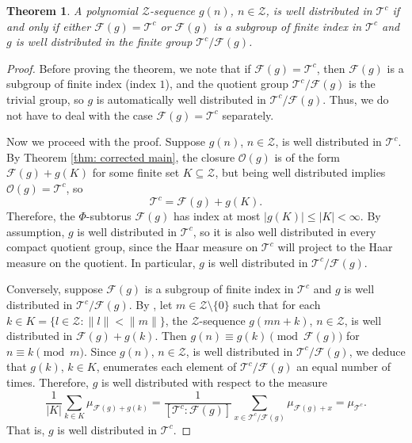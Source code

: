 \documentclass[11pt]{amsart}
\theoremstyle{theorem}
\newtheorem{theorem}{Theorem}[section]
\theoremstyle{definition}
\newcommand{\mZ}{\mathcal{Z}}
\newcommand{\mT}{\mathcal{T}}
\newcommand{\mF}{\mathcal{F}}
\newcommand{\mO}{\mathcal{O}}
\begin{document}
\begin{theorem} \label{thm: correct iff well distributed}
    A polynomial $\mZ$-sequence $g(n)$, $n \in \mZ$, is well distributed in $\mT^c$ if and only if either $\mF(g) = \mT^c$ or $\mF(g)$ is a subgroup of finite index in $\mT^c$ and $g$ is well distributed in the finite group $\mT^c/\mF(g)$.
\end{theorem}

\begin{proof}
    Before proving the theorem, we note that if $\mF(g) = \mT^c$, then $\mF(g)$ is a subgroup of finite index (index $1$), and the quotient group $\mT^c/\mF(g)$ is the trivial group, so $g$ is automatically well distributed in $\mT^c/\mF(g)$.
    Thus, we do not have to deal with the case $\mF(g) = \mT^c$ separately.
    
    Now we proceed with the proof.
    Suppose $g(n)$, $n \in \mZ$, is well distributed in $\mT^c$.
    By Theorem \ref{thm: corrected main}, the closure $\mO(g)$ is of the form $\mF(g) + g(K)$ for some finite set $K \subseteq \mZ$, but being well distributed implies $\mO(g) = \mT^c$, so
    \begin{equation*}
        \mT^c = \mF(g) + g(K).
    \end{equation*}
    Therefore, the $\Phi$-subtorus $\mF(g)$ has index at most $|g(K)| \le |K| < \infty$.
    By assumption, $g$ is well distributed in $\mT^c$, so it is also well distributed in every compact quotient group, since the Haar measure on $\mT^c$ will project to the Haar measure on the quotient.
    In particular, $g$ is well distributed in $\mT^c/\mF(g)$.

    Conversely, suppose $\mF(g)$ is a subgroup of finite index in $\mT^c$ and $g$ is well distributed in $\mT^c/\mF(g)$.
    By \cite[Theorem 8.1]{bl}, let $m \in \mZ \setminus \{0\}$ such that for each $k \in K = \{l \in \mZ : \|l\| < \|m\|\}$, the $\mZ$-sequence $g(mn+k)$, $n \in \mZ$, is well distributed in $\mF(g) + g(k)$.
    Then $g(n) \equiv g(k) \pmod{\mF(g)}$ for $n \equiv k \pmod{m}$.
    Since $g(n)$, $n \in \mZ$, is well distributed in $\mT^c/\mF(g)$, we deduce that $g(k)$, $k \in K$, enumerates each element of $\mT^c/\mF(g)$ an equal number of times.
    Therefore, $g$ is well distributed with respect to the measure
    \begin{equation*}
        \frac{1}{|K|} \sum_{k \in K} \mu_{\mF(g) + g(k)} = \frac{1}{[\mT^c : \mF(g)]} \sum_{x \in \mT^c/\mF(g)} \mu_{\mF(g)+x} = \mu_{\mT^c}.
    \end{equation*}
    That is, $g$ is well distributed in $\mT^c$.
\end{proof}
\end{document}
